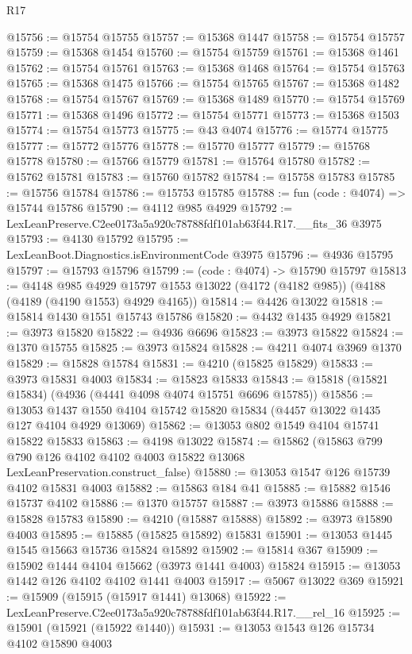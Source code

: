 \begin{lexlean}{R17}
\begin{coremodule}
@15756 := @15754 @15755
@15757 := @15368 @1447
@15758 := @15754 @15757
@15759 := @15368 @1454
@15760 := @15754 @15759
@15761 := @15368 @1461
@15762 := @15754 @15761
@15763 := @15368 @1468
@15764 := @15754 @15763
@15765 := @15368 @1475
@15766 := @15754 @15765
@15767 := @15368 @1482
@15768 := @15754 @15767
@15769 := @15368 @1489
@15770 := @15754 @15769
@15771 := @15368 @1496
@15772 := @15754 @15771
@15773 := @15368 @1503
@15774 := @15754 @15773
@15775 := @43 @4074
@15776 := @15774 @15775
@15777 := @15772 @15776
@15778 := @15770 @15777
@15779 := @15768 @15778
@15780 := @15766 @15779
@15781 := @15764 @15780
@15782 := @15762 @15781
@15783 := @15760 @15782
@15784 := @15758 @15783
@15785 := @15756 @15784
@15786 := @15753 @15785
@15788 := fun (code : @4074) => @15744 @15786
@15790 := @4112 @985 @4929
@15792 := LexLeanPreserve.C2ee0173a5a920c78788fdf101ab63f44.R17.__fits_36 @3975
@15793 := @4130 @15792
@15795 := LexLeanBoot.Diagnostics.isEnvironmentCode @3975
@15796 := @4936 @15795
@15797 := @15793 @15796
@15799 := (code : @4074) -> @15790 @15797
@15813 := @4148
    @985
    @4929
    @15797
    @1553
    @13022
    (@4172 (@4182 @985))
    (@4188 (@4189 (@4190 @1553) @4929 @4165))
@15814 := @4426 @13022
@15818 := @15814 @1430 @1551 @15743 @15786
@15820 := @4432 @1435 @4929
@15821 := @3973 @15820
@15822 := @4936 @6696
@15823 := @3973 @15822
@15824 := @1370 @15755
@15825 := @3973 @15824
@15828 := @4211 @4074 @3969 @1370
@15829 := @15828 @15784
@15831 := @4210 (@15825 @15829)
@15833 := @3973 @15831 @4003
@15834 := @15823 @15833
@15843 := @15818 (@15821 @15834) (@4936 (@4441 @4098 @4074 @15751 @6696 @15785))
@15856 := @13053 @1437 @1550 @4104 @15742 @15820 @15834 (@4457 @13022 @1435 @127 @4104 @4929 @13069)
@15862 := @13053 @802 @1549 @4104 @15741 @15822 @15833
@15863 := @4198 @13022
@15874 := @15862
    (@15863 @799 @790 @126 @4102 @4102 @4003 @15822 @13068 LexLeanPreservation.construct_false)
@15880 := @13053 @1547 @126 @15739 @4102 @15831 @4003
@15882 := @15863 @184 @41
@15885 := @15882 @1546 @15737 @4102
@15886 := @1370 @15757
@15887 := @3973 @15886
@15888 := @15828 @15783
@15890 := @4210 (@15887 @15888)
@15892 := @3973 @15890 @4003
@15895 := @15885 (@15825 @15892) @15831
@15901 := @13053 @1445 @1545 @15663 @15736 @15824 @15892
@15902 := @15814 @367
@15909 := @15902 @1444 @4104 @15662 (@3973 @1441 @4003) @15824
@15915 := @13053 @1442 @126 @4102 @4102 @1441 @4003
@15917 := @5067 @13022 @369
@15921 := @15909 (@15915 (@15917 @1441) @13068)
@15922 := LexLeanPreserve.C2ee0173a5a920c78788fdf101ab63f44.R17.__rel_16
@15925 := @15901 (@15921 (@15922 @1440))
@15931 := @13053 @1543 @126 @15734 @4102 @15890 @4003

\end{coremodule}
\end{lexlean}
